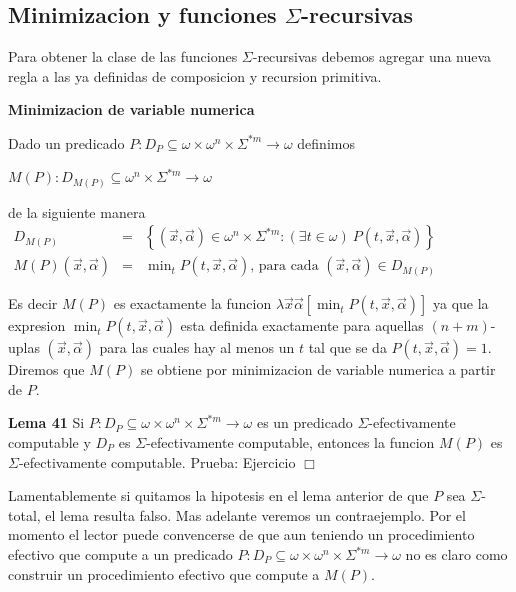 \subsection{Minimizacion y funciones \(\Sigma \)-recursivas}

Para obtener la clase de las funciones \(\Sigma \)-recursivas debemos agregar una nueva regla a las ya definidas de composicion y recursion primitiva.


\textbf{Minimizacion de variable numerica}

Dado un predicado \(P:D_{P}\subseteq \omega \times \omega ^{n}\times \Sigma ^{\ast m}\rightarrow \omega \) definimos

\(\displaystyle M(P):D_{M(P)}\subseteq \omega ^{n}\times \Sigma ^{\ast m}\rightarrow \omega \)

de la siguiente manera
\(\displaystyle \begin{array}{rcl} D_{M(P)} & =& \left\{ (\vec{x},\vec{\alpha})\in \omega ^{n}\times \Sigma ^{\ast m}:(\exists t\in \omega )\ P(t,\vec{x},\vec{\alpha})\right\} \\ M(P)(\vec{x},\vec{\alpha}) & =& \min_{t}P(t,\vec{x},\vec{\alpha})\text{, para cada }(\vec{x},\vec{\alpha})\in D_{M(P)} \end{array} \)

Es decir \(M(P)\) es exactamente la funcion \(\lambda \vec{x}\vec{\alpha}\left[ \min_{t}P(t,\vec{x},\vec{\alpha})\right] \) ya que la expresion \(\min_{t}P(t, \vec{x},\vec{\alpha})\) esta definida exactamente para aquellas \((n+m)\)-uplas \((\vec{x},\vec{\alpha})\) para las cuales hay al menos un \(t\) tal que se da \( P(t,\vec{x},\vec{\alpha})=1\). Diremos que \(M(P)\) se obtiene por minimizacion de variable numerica a partir de \(P\).


\textbf{Lema 41} Si \(P:D_{P}\subseteq \omega \times \omega ^{n}\times \Sigma ^{\ast m}\rightarrow \omega \) es un predicado \(\Sigma \)-efectivamente computable y \( D_{P}\) es \(\Sigma \)-efectivamente computable, entonces la funcion \(M(P)\) es \( \Sigma \)-efectivamente computable.
Prueba: Ejercicio \(\Box\)

Lamentablemente si quitamos la hipotesis en el lema anterior de que \(P\) sea \( \Sigma \)-total, el lema resulta falso. Mas adelante veremos un contraejemplo. Por el momento el lector puede convencerse de que aun teniendo un procedimiento efectivo que compute a un predicado \( P:D_{P}\subseteq \omega \times \omega ^{n}\times \Sigma ^{\ast m}\rightarrow \omega \) no es claro como construir un procedimiento efectivo que compute a \( M(P)\).

